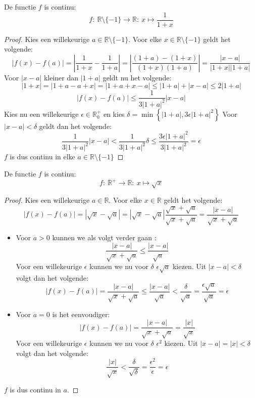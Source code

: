 \documentclass[main.tex]{subfiles}
\begin{document}
\begin{vb}
  De functie $f$ is continu:
  \[ f:\ \mathbb{R} \setminus \{-1\} \rightarrow \mathbb{R}:\ x \mapsto \frac{1}{1+x} \]

  \begin{proof}
    Kies een willekeurige $a\in \mathbb{R}\setminus \{-1\}$.
    Voor elke $x\in \mathbb{R}\setminus \{-1\}$ geldt het volgende:
    \[ |f(x)-f(a)| = \left| \frac{1}{1+x}-\frac{1}{1+a} \right| = \left| \frac{(1+a)-(1+x)}{(1+x)(1+a)} \right|  = \frac{|x-a|}{|1+x||1+a|} \]
    Voor $|x-a|$ kleiner dan $|1+a|$ geldt nu het volgende:
    \[ |1+x| = |1+a-a+x| = |1+a+x-a| \le |1+a|+|x-a| \le 2|1+a| \]
    \[ |f(x)-f(a)| \le  \frac{1}{3|1+a|^{2}}|x-a| \]
    Kies nu een willekeurige $\epsilon \in \mathbb{R}_{0}^{+}$ en kies $\delta = \min\left\{ |1+a|,3\epsilon|1+a|^{2}\right\}$
    Voor $|x-a| < \delta$ geldt dan het volgende:
    \[ \frac{1}{3|1+a|^{2}}|x-a| < \frac{1}{3|1+a|^{2}}\delta \le \frac{3\epsilon|1+a|^{2}}{3|1+a|^{2}} = \epsilon\]
    $f$ is dus continu in elke $a \in \mathbb{R}\setminus \{-1\}$
  \end{proof}
\end{vb}

\begin{vb}
  De functie $f$ is continu:
  \[ f:\ \mathbb{R}^{+} \rightarrow \mathbb{R}:\ x \mapsto \sqrt{x} \]

  \begin{proof}
    Kies een willekeurige $a \in \mathbb{R}$.
    Voor elke $x \in \mathbb{R}$ geldt het volgende:
    \[ |f(x)-f(a)| = |\sqrt{x}-\sqrt{a}| = \left|\sqrt{x}-\sqrt{a}\right|\frac{\sqrt{x}+\sqrt{a}}{\sqrt{x}+\sqrt{a}} = \frac{|x-a|}{\sqrt{x}+\sqrt{a}} \]
    \begin{itemize}
    \item Voor $a>0$ kunnen we als volgt verder gaan :
      \[ \frac{|x-a|}{\sqrt{x}+\sqrt{a}} \le \frac{|x-a|}{\sqrt{a}} \]
      Voor een willekeurige $\epsilon$ kunnen we nu voor $\delta$ $\epsilon\sqrt{a}$ kiezen.
      Uit $|x-a|< \delta$ volgt dan het volgende:
      \[ |f(x)-f(a)| = \frac{|x-a|}{\sqrt{x}+\sqrt{a}} \le \frac{|x-a|}{\sqrt{a}} < \frac{\delta}{\sqrt{a}} = \frac{\epsilon\sqrt{a}}{\sqrt{a}} = \epsilon \]
    \item Voor $a=0$ is het eenvoudiger:
      \[ |f(x)-f(a)| =  \frac{|x-a|}{\sqrt{x}+\sqrt{a}} = \frac{|x|}{\sqrt{x}} \]
      Voor een willekeurige $\epsilon$ kunnen we nu voor $\delta$ $\epsilon^{2}$ kiezen. 
      Uit $|x-a|=|x|< \delta$ volgt dan het volgende:
      \[ \frac{|x|}{\sqrt{x}} < \frac{\delta}{\sqrt{\delta}} = \frac{\epsilon^{2}}{\epsilon} = \epsilon \]
    \end{itemize}
    $f$ is dus continu in $a$.
  \end{proof}
\end{vb}
\end{document}
